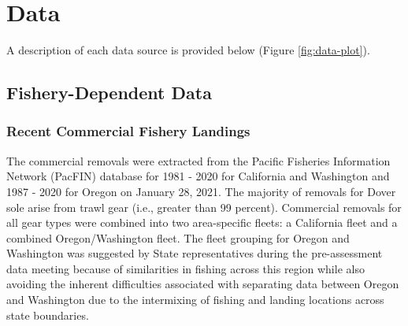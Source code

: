 \documentclass[11pt,
  english,
  a4paper,
]{article}
\begin{document}
\leavevmode\tagmcend\tagstructend\par


\hypertarget{data}{%
\section{Data}\label{data}}

\leavevmode\tagmcend\tagstructend


A description of each data source is provided below (Figure \ref{fig:data-plot}).

\leavevmode\tagmcend\tagstructend\par


\hypertarget{fishery-dependent-data}{%
\subsection{Fishery-Dependent Data}\label{fishery-dependent-data}}

\leavevmode\tagmcend\tagstructend


\hypertarget{recent-commercial-fishery-landings}{%
\subsubsection{Recent Commercial Fishery Landings}\label{recent-commercial-fishery-landings}}

\leavevmode\tagmcend\tagstructend


The commercial removals were extracted from the Pacific Fisheries Information Network (PacFIN) database for 1981 - 2020 for California and Washington and 1987 - 2020 for Oregon on January 28, 2021. The majority of removals for Dover sole arise from trawl gear (i.e., greater than 99 percent). Commercial removals for all gear types were combined into two area-specific fleets: a California fleet and a combined Oregon/Washington fleet. The fleet grouping for Oregon and Washington was suggested by State representatives during the pre-assessment data meeting because of similarities in fishing across this region while also avoiding the inherent difficulties associated with separating data between Oregon and Washington due to the intermixing of fishing and landing locations across state boundaries.
\end{document}
